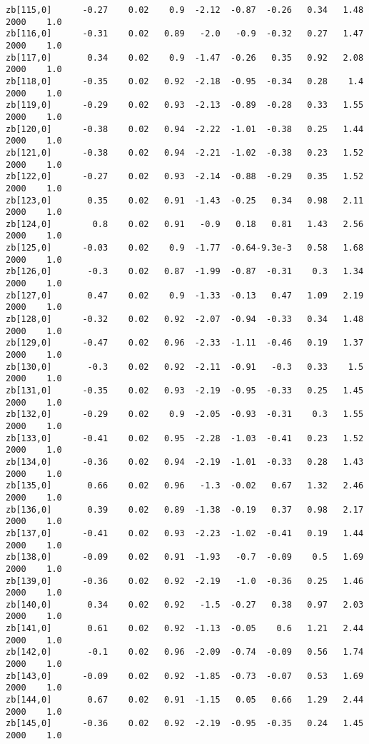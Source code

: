 \documentclass[11pt]{article}
\begin{document}
\begin{Verbatim}[commandchars=\\\{\}]
zb[115,0]      -0.27    0.02    0.9  -2.12  -0.87  -0.26   0.34   1.48   2000    1.0
zb[116,0]      -0.31    0.02   0.89   -2.0   -0.9  -0.32   0.27   1.47   2000    1.0
zb[117,0]       0.34    0.02    0.9  -1.47  -0.26   0.35   0.92   2.08   2000    1.0
zb[118,0]      -0.35    0.02   0.92  -2.18  -0.95  -0.34   0.28    1.4   2000    1.0
zb[119,0]      -0.29    0.02   0.93  -2.13  -0.89  -0.28   0.33   1.55   2000    1.0
zb[120,0]      -0.38    0.02   0.94  -2.22  -1.01  -0.38   0.25   1.44   2000    1.0
zb[121,0]      -0.38    0.02   0.94  -2.21  -1.02  -0.38   0.23   1.52   2000    1.0
zb[122,0]      -0.27    0.02   0.93  -2.14  -0.88  -0.29   0.35   1.52   2000    1.0
zb[123,0]       0.35    0.02   0.91  -1.43  -0.25   0.34   0.98   2.11   2000    1.0
zb[124,0]        0.8    0.02   0.91   -0.9   0.18   0.81   1.43   2.56   2000    1.0
zb[125,0]      -0.03    0.02    0.9  -1.77  -0.64-9.3e-3   0.58   1.68   2000    1.0
zb[126,0]       -0.3    0.02   0.87  -1.99  -0.87  -0.31    0.3   1.34   2000    1.0
zb[127,0]       0.47    0.02    0.9  -1.33  -0.13   0.47   1.09   2.19   2000    1.0
zb[128,0]      -0.32    0.02   0.92  -2.07  -0.94  -0.33   0.34   1.48   2000    1.0
zb[129,0]      -0.47    0.02   0.96  -2.33  -1.11  -0.46   0.19   1.37   2000    1.0
zb[130,0]       -0.3    0.02   0.92  -2.11  -0.91   -0.3   0.33    1.5   2000    1.0
zb[131,0]      -0.35    0.02   0.93  -2.19  -0.95  -0.33   0.25   1.45   2000    1.0
zb[132,0]      -0.29    0.02    0.9  -2.05  -0.93  -0.31    0.3   1.55   2000    1.0
zb[133,0]      -0.41    0.02   0.95  -2.28  -1.03  -0.41   0.23   1.52   2000    1.0
zb[134,0]      -0.36    0.02   0.94  -2.19  -1.01  -0.33   0.28   1.43   2000    1.0
zb[135,0]       0.66    0.02   0.96   -1.3  -0.02   0.67   1.32   2.46   2000    1.0
zb[136,0]       0.39    0.02   0.89  -1.38  -0.19   0.37   0.98   2.17   2000    1.0
zb[137,0]      -0.41    0.02   0.93  -2.23  -1.02  -0.41   0.19   1.44   2000    1.0
zb[138,0]      -0.09    0.02   0.91  -1.93   -0.7  -0.09    0.5   1.69   2000    1.0
zb[139,0]      -0.36    0.02   0.92  -2.19   -1.0  -0.36   0.25   1.46   2000    1.0
zb[140,0]       0.34    0.02   0.92   -1.5  -0.27   0.38   0.97   2.03   2000    1.0
zb[141,0]       0.61    0.02   0.92  -1.13  -0.05    0.6   1.21   2.44   2000    1.0
zb[142,0]       -0.1    0.02   0.96  -2.09  -0.74  -0.09   0.56   1.74   2000    1.0
zb[143,0]      -0.09    0.02   0.92  -1.85  -0.73  -0.07   0.53   1.69   2000    1.0
zb[144,0]       0.67    0.02   0.91  -1.15   0.05   0.66   1.29   2.44   2000    1.0
zb[145,0]      -0.36    0.02   0.92  -2.19  -0.95  -0.35   0.24   1.45   2000    1.0

\end{Verbatim}
\end{document}

